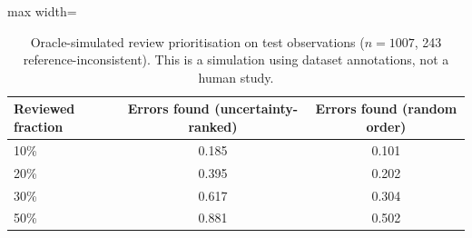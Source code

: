 \begin{table}[!t]
\centering
\footnotesize
\caption{Oracle-simulated review prioritisation on test observations ($n=1007$, 243 reference-inconsistent). This is a simulation using dataset annotations, not a human study.}
\label{tab:exp8}
\begin{adjustbox}{max width=\textwidth}
\begin{tabular}{lcc}
\toprule
Reviewed fraction & Errors found (uncertainty-ranked) & Errors found (random order) \\
\midrule
10\% & 0.185 & 0.101 \\
20\% & 0.395 & 0.202 \\
30\% & 0.617 & 0.304 \\
50\% & 0.881 & 0.502 \\
\bottomrule
\end{tabular}
\end{adjustbox}
\end{table}
